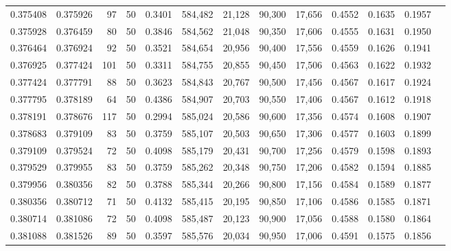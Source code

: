 \begin{tabular}{rrrrrrrrrrrrr}
0.375408 & 0.375926 &    97 &  50 &                                     0.3401 & 584,482 &  21,128 &  90,300 &  17,656 & 0.4552 & 0.1635 & 0.1957 \\
0.375928 & 0.376459 &    80 &  50 &                                     0.3846 & 584,562 &  21,048 &  90,350 &  17,606 & 0.4555 & 0.1631 & 0.1950 \\
0.376464 & 0.376924 &    92 &  50 &                                     0.3521 & 584,654 &  20,956 &  90,400 &  17,556 & 0.4559 & 0.1626 & 0.1941 \\
0.376925 & 0.377424 &   101 &  50 &                                     0.3311 & 584,755 &  20,855 &  90,450 &  17,506 & 0.4563 & 0.1622 & 0.1932 \\
0.377424 & 0.377791 &    88 &  50 &                                     0.3623 & 584,843 &  20,767 &  90,500 &  17,456 & 0.4567 & 0.1617 & 0.1924 \\
0.377795 & 0.378189 &    64 &  50 &                                     0.4386 & 584,907 &  20,703 &  90,550 &  17,406 & 0.4567 & 0.1612 & 0.1918 \\
0.378191 & 0.378676 &   117 &  50 &                                     0.2994 & 585,024 &  20,586 &  90,600 &  17,356 & 0.4574 & 0.1608 & 0.1907 \\
0.378683 & 0.379109 &    83 &  50 &                                     0.3759 & 585,107 &  20,503 &  90,650 &  17,306 & 0.4577 & 0.1603 & 0.1899 \\
0.379109 & 0.379524 &    72 &  50 &                                     0.4098 & 585,179 &  20,431 &  90,700 &  17,256 & 0.4579 & 0.1598 & 0.1893 \\
0.379529 & 0.379955 &    83 &  50 &                                     0.3759 & 585,262 &  20,348 &  90,750 &  17,206 & 0.4582 & 0.1594 & 0.1885 \\
0.379956 & 0.380356 &    82 &  50 &                                     0.3788 & 585,344 &  20,266 &  90,800 &  17,156 & 0.4584 & 0.1589 & 0.1877 \\
0.380356 & 0.380712 &    71 &  50 &                                     0.4132 & 585,415 &  20,195 &  90,850 &  17,106 & 0.4586 & 0.1585 & 0.1871 \\
0.380714 & 0.381086 &    72 &  50 &                                     0.4098 & 585,487 &  20,123 &  90,900 &  17,056 & 0.4588 & 0.1580 & 0.1864 \\
0.381088 & 0.381526 &    89 &  50 &                                     0.3597 & 585,576 &  20,034 &  90,950 &  17,006 & 0.4591 & 0.1575 & 0.1856 \\

\end{tabular}
